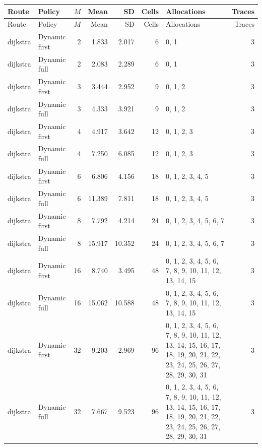 \documentclass[10pt,a4paper]{article}
\begin{document}
\tiny\setlength{\tabcolsep}{2pt}\begin{longtable}{@{}p{23mm}p{29mm}rrrrp{36mm}r@{}}
\toprule Route & Policy & $M$ & Mean & SD & Cells & Allocations & Traces \\ \midrule\endfirsthead
\toprule Route & Policy & $M$ & Mean & SD & Cells & Allocations & Traces \\ \midrule\endhead
\bottomrule\endfoot
dijkstra & Dynamic first & 2 & 1.833 & 2.017 & 6 & 0, 1 & 3 \\
dijkstra & Dynamic full & 2 & 2.083 & 2.289 & 6 & 0, 1 & 3 \\
dijkstra & Dynamic first & 3 & 3.444 & 2.952 & 9 & 0, 1, 2 & 3 \\
dijkstra & Dynamic full & 3 & 4.333 & 3.921 & 9 & 0, 1, 2 & 3 \\
dijkstra & Dynamic first & 4 & 4.917 & 3.642 & 12 & 0, 1, 2, 3 & 3 \\
dijkstra & Dynamic full & 4 & 7.250 & 6.085 & 12 & 0, 1, 2, 3 & 3 \\
dijkstra & Dynamic first & 6 & 6.806 & 4.156 & 18 & 0, 1, 2, 3, 4, 5 & 3 \\
dijkstra & Dynamic full & 6 & 11.389 & 7.811 & 18 & 0, 1, 2, 3, 4, 5 & 3 \\
dijkstra & Dynamic first & 8 & 7.792 & 4.214 & 24 & 0, 1, 2, 3, 4, 5, 6, 7 & 3 \\
dijkstra & Dynamic full & 8 & 15.917 & 10.352 & 24 & 0, 1, 2, 3, 4, 5, 6, 7 & 3 \\
dijkstra & Dynamic first & 16 & 8.740 & 3.495 & 48 & 0, 1, 2, 3, 4, 5, 6, 7, 8, 9, 10, 11, 12, 13, 14, 15 & 3 \\
dijkstra & Dynamic full & 16 & 15.062 & 10.588 & 48 & 0, 1, 2, 3, 4, 5, 6, 7, 8, 9, 10, 11, 12, 13, 14, 15 & 3 \\
dijkstra & Dynamic first & 32 & 9.203 & 2.969 & 96 & 0, 1, 2, 3, 4, 5, 6, 7, 8, 9, 10, 11, 12, 13, 14, 15, 16, 17, 18, 19, 20, 21, 22, 23, 24, 25, 26, 27, 28, 29, 30, 31 & 3 \\
dijkstra & Dynamic full & 32 & 7.667 & 9.523 & 96 & 0, 1, 2, 3, 4, 5, 6, 7, 8, 9, 10, 11, 12, 13, 14, 15, 16, 17, 18, 19, 20, 21, 22, 23, 24, 25, 26, 27, 28, 29, 30, 31 & 3 \\
\end{longtable}\normalsize\setlength{\tabcolsep}{6pt}
\clearpage
\end{document}
